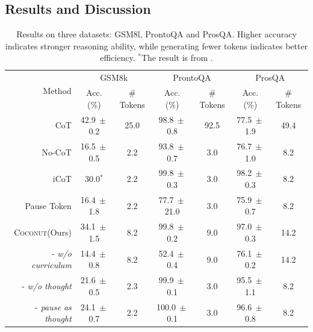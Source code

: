 \documentclass[]{fairmeta}
\newcommand{\ours}{\textsc{Coconut}\xspace}
\newcommand{\dataset}{ProsQA}
\begin{document}
\subsection{Results and Discussion}

\begin{table}
    \centering
    \label{tab:main}
    \vspace{-20pt}
    \begin{tabular}{@{}rcccccc}
    
    \toprule
    \multirow{2}{*}[-2pt]{Method} & \multicolumn{2}{c}{GSM8k} & \multicolumn{2}{c}{ProntoQA} & \multicolumn{2}{c}{\dataset}\\
    \cmidrule{2-7}
          & Acc. (\%) & \# Tokens & Acc. (\%) & \# Tokens & Acc. (\%) & \# Tokens \\
        \midrule
        CoT  & 42.9{\scriptsize$\ \pm$0.2} & 25.0 &  98.8{\scriptsize$\ \pm$0.8} & 92.5 &  77.5{\scriptsize$\ \pm$1.9} & 49.4 \\
        \midrule
        No-CoT  & 16.5{\scriptsize$\ \pm$0.5} & 2.2 & 93.8{\scriptsize$\ \pm$0.7}  & 3.0 & 76.7{\scriptsize$\ \pm$1.0} & 8.2 \\
        iCoT  & 30.0$^*$ &  2.2 &  99.8{\scriptsize$\ \pm$0.3} &  3.0 & 98.2{\scriptsize$\ \pm$0.3} & 8.2 \\
        Pause Token &  16.4{\scriptsize$\ \pm$1.8} & 2.2 & 77.7{\scriptsize$\ \pm$21.0} & 3.0 &  75.9{\scriptsize$\ \pm$0.7} & 8.2 \\
        \midrule
        
        \ours (Ours) & 34.1{\scriptsize$\ \pm$1.5} & 8.2  & 99.8{\scriptsize$\ \pm$0.2} & 9.0 &  97.0{\scriptsize$\ \pm$0.3} & 14.2 \\
        
        - \textit{w/o curriculum} & 14.4{\scriptsize$\ \pm$0.8} & 8.2 & 52.4{\scriptsize$\ \pm$0.4} & 9.0 &  76.1{\scriptsize$\ \pm$0.2} & 14.2 \\
        - \textit{w/o thought} & 21.6{\scriptsize$\ \pm$0.5}  & 2.3 &  99.9{\scriptsize$\ \pm$0.1} & 3.0 &  95.5{\scriptsize$\ \pm$1.1} & 8.2 \\
        - \textit {pause as thought} & 24.1{\scriptsize$\ \pm$0.7} & 2.2 & 100.0{\scriptsize$\ \pm$0.1} & 3.0 &  96.6{\scriptsize$\ \pm$0.8} & 8.2 \\
    \bottomrule 
    \end{tabular}
     \small
    \caption{Results on three datasets: GSM8l, ProntoQA and ProsQA. Higher accuracy indicates stronger reasoning ability, while generating fewer tokens indicates better efficiency. $^*$The result is from \citet{deng2024explicit}.}
    \label{tab:main}
    \vspace{-10pt}
\end{table}
\end{document}
